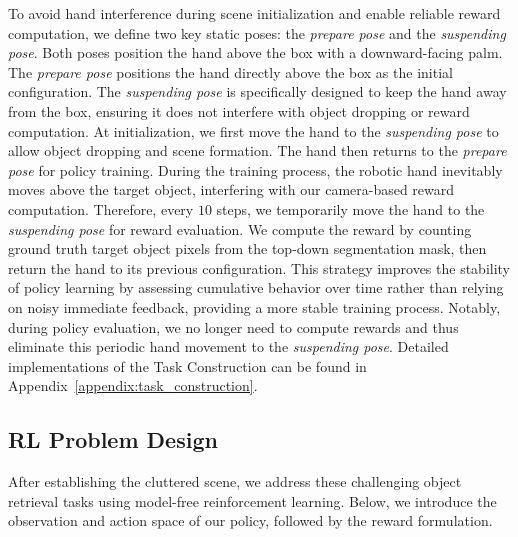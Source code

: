 \documentclass[10pt, a4paper, logo, twocolumn, copyright]{psibot} %
\begin{document}
To avoid hand interference during scene initialization and enable reliable reward computation, we define two key static poses: the \textit{prepare pose} and the \textit{suspending pose}. Both poses position the hand above the box with a downward-facing palm. The \textit{prepare pose} positions the hand directly above the box as the initial configuration. The \textit{suspending pose} is specifically designed to keep the hand away from the box, ensuring it does not interfere with object dropping or reward computation. At initialization, we first move the hand to the \textit{suspending pose} to allow object dropping and scene formation. The hand then returns to the \textit{prepare pose} for policy training. During the training process, the robotic hand inevitably moves above the target object, interfering with our camera-based reward computation. Therefore, every $10$ steps, we temporarily move the hand to the \textit{suspending pose} for reward evaluation. We compute the reward by counting ground truth target object pixels from the top-down segmentation mask, then return the hand to its previous configuration. This strategy improves the stability of policy learning by assessing cumulative behavior over time rather than relying on noisy immediate feedback, providing a more stable training process. Notably, during policy evaluation, we no longer need to compute rewards and thus eliminate this periodic hand movement to the \textit{suspending pose}. Detailed implementations of the Task Construction can be found in Appendix~\ref{appendix:task_construction}.

\subsection{RL Problem Design}\label{sec:rl_design}
After establishing the cluttered scene, we address these challenging object retrieval tasks using model-free reinforcement learning. Below, we introduce the observation and action space of our policy, followed by the reward formulation.
\end{document}

